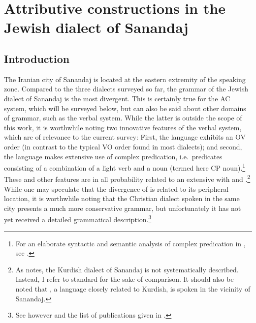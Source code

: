 \chapter{Attributive constructions in the Jewish dialect of Sanandaj} \label{ch:Sanandaj}

\renewcommand{\defaultDialect}{\JSan}

\section{Introduction}

The Iranian city of Sanandaj is located at the eastern extremity of the  speaking zone. Compared to the three dialects surveyed so far, the grammar of the Jewish dialect of Sanandaj is the most divergent. This is certainly true for the AC system, which will be surveyed below, but can also be said about other domains of grammar, such as the verbal system. While the latter is outside the scope of this work, it is worthwhile noting two innovative features of the verbal system, which are of relevance to the current survey: First, the language exhibits an OV order (in contrast to the typical VO order found in most  dialects); and second, the language makes extensive use of complex predication, i.e.\ predicates consisting of a combination of a light verb and a noun (termed here CP noun).\footnote{For an elaborate syntactic and semantic analysis of complex predication in \Per, see \citet{SamvelianComplex}.} 
 These and other features are in all probability related to an extensive  with \Sor and \Per \citep[11f.]{KhanSanandaj}.\footnote{As \citet[11]{KhanSanandaj} notes, the Kurdish dialect of Sanandaj is not systematically described. Instead, I refer to standard \Sor for the sake of comparison. It should also be noted that \Hawr, a  language closely related to Kurdish, is spoken in the vicinity of Sanandaj.}
  While one may speculate that the divergence of \JSan is related to its peripheral location, it is worthwhile noting that the Christian dialect spoken in the same city presents a much more conservative grammar, but unfortunately it has not yet received  a detailed grammatical description.\footnote{See however \citet{PanoussiSenaya,HeinrichsSenaya} and the list of publications given in \citet{McPhersonCaldani}.}

